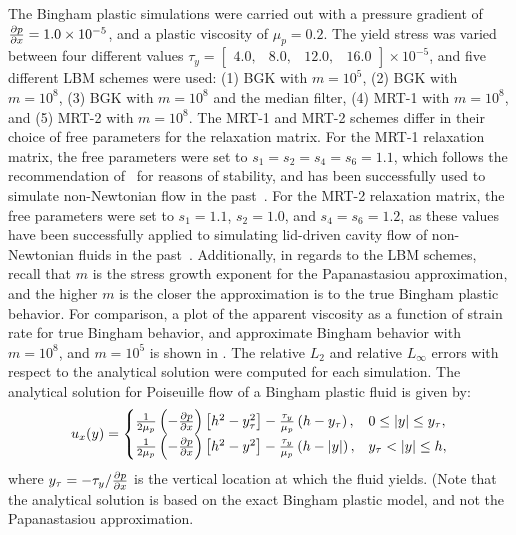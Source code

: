 The Bingham plastic simulations were carried out with a pressure gradient of $\frac{\partial p}{\partial x} = 1.0 \times 10^{-5}$, and a plastic viscosity of $\mu_p = 0.2$.
The yield stress was varied between four different values $\tau_y = \begin{bmatrix}4.0,&8.0,&12.0,&16.0\end{bmatrix} \times 10^{-5}$, and five different LBM schemes were used: (1) BGK with $m = 10^5$, (2) BGK with $m = 10^8$, (3) BGK with $m = 10^8$ and the median filter, (4) MRT-1 with $m = 10^8$, and (5) MRT-2 with $m = 10^8$.
The MRT-1 and MRT-2 schemes differ in their choice of free parameters for the relaxation matrix.
For the MRT-1 relaxation matrix, the free parameters were set to $s_1 = s_2 = s_4 = s_6 = 1.1$, which follows the recommendation of~\cite{lallemand2000theory} for reasons of stability, and has been successfully used to simulate non-Newtonian flow in the past~\cite{fallah2012multiple,grasinger2015simulation}. 
For the MRT-2 relaxation matrix, the free parameters were set to $s_1 = 1.1$, $s_2 = 1.0$, and $s_4 = s_6 = 1.2$, as these values have been successfully applied to simulating lid-driven cavity flow of non-Newtonian fluids in the past~\cite{chen2014simulations,li2014simulation}.
Additionally, in regards to the LBM schemes, recall that $m$ is the stress growth exponent for the Papanastasiou approximation, and the higher $m$ is the closer the approximation is to the true Bingham plastic behavior.
For comparison, a plot of the apparent viscosity as a function of strain rate for true Bingham behavior, and approximate Bingham behavior with $m = 10^8$, and $m = 10^5$ is shown in .
The relative $L_2$ and relative $L_{\infty}$ errors with respect to the analytical solution were computed for each simulation.
The analytical solution for Poiseuille flow of a Bingham plastic fluid is given by:
\begin{equation} \label{eq:analytical-bingham}
u_x(y) = \begin{cases}
\frac{1}{2 \mu_p} \left(-\frac{\partial p}{\partial x}\right) \left[h^2 - y_{\tau}^2 \right] - \frac{\tau_y}{\mu_p} \left(h - y_{\tau}\right), & 0 \leq |y| \leq y_{\tau}, \\
\frac{1}{2 \mu_p} \left(-\frac{\partial p}{\partial x}\right) \left[h^2 - y^2 \right] - \frac{\tau_y}{\mu_p} \left(h - |y|\right), & y_{\tau} < |y| \leq h,
\end{cases}
\end{equation}
\noindent where $y_{\tau} = -\tau_y / \frac{\partial p}{\partial x}$ is the vertical location at which the fluid yields.
(Note that the analytical solution is based on the exact Bingham plastic model, and not the Papanastasiou approximation.
